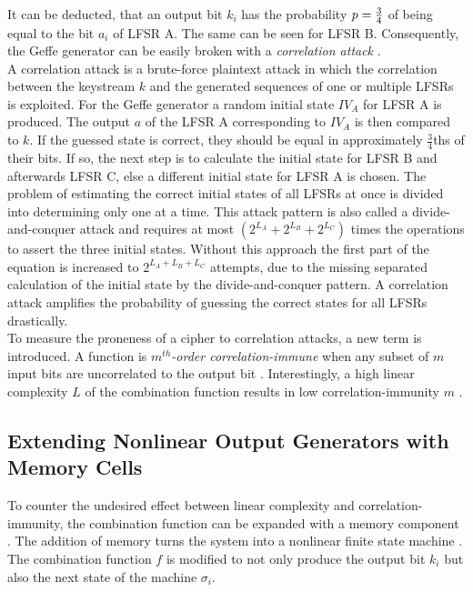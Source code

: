 It can be deducted, that an output bit $k_i$ has the probability $\space p=\frac{3}{4} \space$ of being equal to the bit $a_i$ of LFSR A. The same can be seen for LFSR B. Consequently, the Geffe generator can be easily broken with a \emph{correlation attack} \cite[p. 104]{Pommerening.2000}. \\ 

A correlation attack is a brute-force plaintext attack in which the correlation between the keystream $k$ and the generated sequences of one or multiple LFSRs is exploited. For the Geffe generator a random initial state $IV_A$ for LFSR A is produced. The output $a$ of the LFSR A corresponding to $IV_A$ is then compared to $k$. If the guessed state is correct, they should be equal in approximately $\frac{3}{4}$ths of their bits. If so, the next step is to calculate the initial state for LFSR B and afterwards LFSR C, else a different initial state for LFSR A is chosen. The problem of estimating the correct initial states of all LFSRs at once is divided into determining only one at a time. This attack pattern is also called a divide-and-conquer attack \cite[p. 17]{Robshaw.1995} and requires at most $(2^{L_A}+2^{L_B}+2^{L_C})$ times the operations to assert the three initial states. Without this approach the first part of the equation is increased to $2^{L_A+L_B+L_C}$ attempts, due to the missing separated calculation of the initial state by the divide-and-conquer pattern. A correlation attack amplifies the probability of guessing the correct states for all LFSRs drastically. \cite[p. 235]{Smart.2016} \\

To measure the proneness of a cipher to correlation attacks, a new term is introduced. A function is \emph{$m^{th}$-order correlation-immune} when any subset of $m$ input bits are uncorrelated to the output bit \cite[p. 777]{Siegenthaler.1984}. Interestingly, a high linear complexity $L$ of the combination function results in low correlation-immunity $m$ \cite[p. 779]{Siegenthaler.1984}. 


\subsection{Extending Nonlinear Output Generators with Memory Cells}

To counter the undesired effect between linear complexity and correlation-immunity, the combination function can be expanded with a memory component \cite[p. 17]{Robshaw.1995}. The addition of memory turns the system into a nonlinear finite state machine \cite[p. 209]{Wu.2008}. The combination function $f$ is modified to not only produce the output bit $k_i$ but also the next state of the machine $\sigma_i$. \\ 

